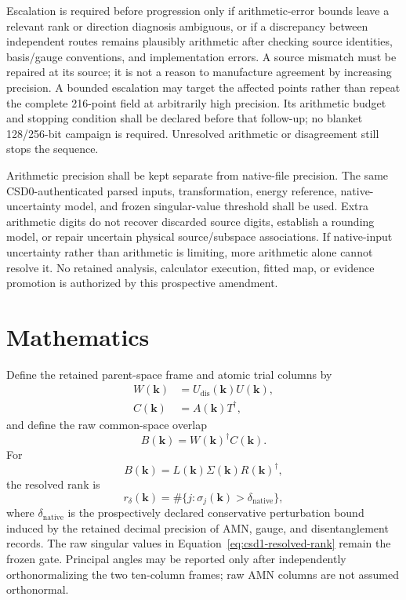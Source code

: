 \documentclass[11pt]{report}
\begin{document}
Escalation is required before progression only if arithmetic-error bounds leave a
relevant rank or direction diagnosis ambiguous, or if a discrepancy between independent
routes remains plausibly arithmetic after checking source identities, basis/gauge
conventions, and implementation errors.  A source mismatch must be repaired at its
source; it is not a reason to manufacture agreement by increasing precision.  A
bounded escalation may target the affected points rather than repeat the complete
216-point field at arbitrarily high precision.  Its arithmetic budget and stopping
condition shall be declared before that follow-up; no blanket 128/256-bit campaign
is required.  Unresolved arithmetic or disagreement still stops the sequence.

Arithmetic precision shall be kept separate from native-file precision.  The same
CSD0-authenticated parsed inputs, transformation, energy reference, native-uncertainty
model, and frozen singular-value threshold shall be used.  Extra arithmetic digits
do not recover discarded source digits, establish a rounding model, or repair
uncertain physical source/subspace associations.  If native-input uncertainty rather
than arithmetic is limiting, more arithmetic alone cannot resolve it.  No retained
analysis, calculator execution, fitted map, or evidence promotion is authorized by
this prospective amendment.

\section{Mathematics}

Define the retained parent-space frame and atomic trial columns by
\begin{align}
 W(\mathbf{k}) &= U_{\mathrm{dis}}(\mathbf{k})U(\mathbf{k}),\\
 C(\mathbf{k}) &= A(\mathbf{k})T^{\dagger},
\end{align}
and define the raw common-space overlap
\begin{equation}
 B(\mathbf{k})=W(\mathbf{k})^{\dagger}C(\mathbf{k}).
 \label{eq:csd1-overlap}
\end{equation}
For
\begin{equation}
 B(\mathbf{k})=L(\mathbf{k})\Sigma(\mathbf{k})R(\mathbf{k})^{\dagger},
\end{equation}
the resolved rank is
\begin{equation}
 r_{\delta}(\mathbf{k})=
 \#\{j:\sigma_j(\mathbf{k})>\delta_{\mathrm{native}}\},
 \label{eq:csd1-resolved-rank}
\end{equation}
where $\delta_{\mathrm{native}}$ is the prospectively declared conservative perturbation
bound induced by the retained decimal precision of AMN, gauge, and disentanglement
records.  The raw singular values in Equation~\eqref{eq:csd1-resolved-rank} remain the
frozen gate.  Principal angles may be reported only after independently
orthonormalizing the two ten-column frames; raw AMN columns are not assumed orthonormal.
\end{document}
